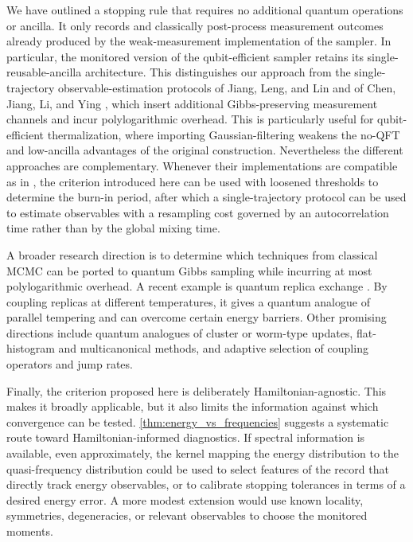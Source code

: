 \documentclass[showpacs,amsmath,amssymb,twocolumn,prx,superscriptaddress,10pt,aps,nofootinbib]{revtex4-2}
\begin{document}
We have outlined a stopping rule that requires no additional quantum operations or ancilla. It only records and classically post-process measurement outcomes already produced by the weak-measurement implementation of the sampler. In particular, the monitored version of the qubit-efficient sampler retains its single-reusable-ancilla architecture. This distinguishes our approach from the single-trajectory observable-estimation protocols of Jiang, Leng, and Lin and of Chen, Jiang, Li, and Ying \cite{Jiang2026,Chen2026b}, which insert additional Gibbs-preserving measurement channels and incur polylogarithmic overhead. This is particularly useful for qubit-efficient thermalization, where importing Gaussian-filtering weakens the no-QFT and low-ancilla advantages of the original construction. Nevertheless the different approaches are complementary. Whenever their implementations are compatible as in \cite{Chen2023b, Chen2023a}, the criterion introduced here can be used with loosened thresholds to determine the burn-in period, after which a single-trajectory protocol can be used to estimate observables with a resampling cost governed by an autocorrelation time rather than by the global mixing time. 

A broader research direction is to determine which techniques from classical MCMC can be ported to quantum Gibbs sampling while incurring at most polylogarithmic overhead. A recent example is quantum replica exchange \cite{chen2025quantum}. By coupling replicas at different temperatures, it gives a quantum analogue of parallel tempering and can overcome certain energy barriers. Other promising directions include quantum analogues of cluster or worm-type updates, flat-histogram and multicanonical methods, and adaptive selection of coupling operators and jump rates.

Finally, the criterion proposed here is deliberately Hamiltonian-agnostic. This makes it broadly applicable, but it also limits the information against which convergence can be tested. \autoref{thm:energy_vs_frequencies} suggests a systematic route toward Hamiltonian-informed diagnostics.
If spectral information is available, even approximately, the kernel mapping the energy distribution to the quasi-frequency distribution could be used to select features of the record that directly track energy observables, or to calibrate stopping tolerances in terms of a desired energy error. A more modest extension would use known locality, symmetries, degeneracies, or relevant observables to choose the monitored moments.
\end{document}
